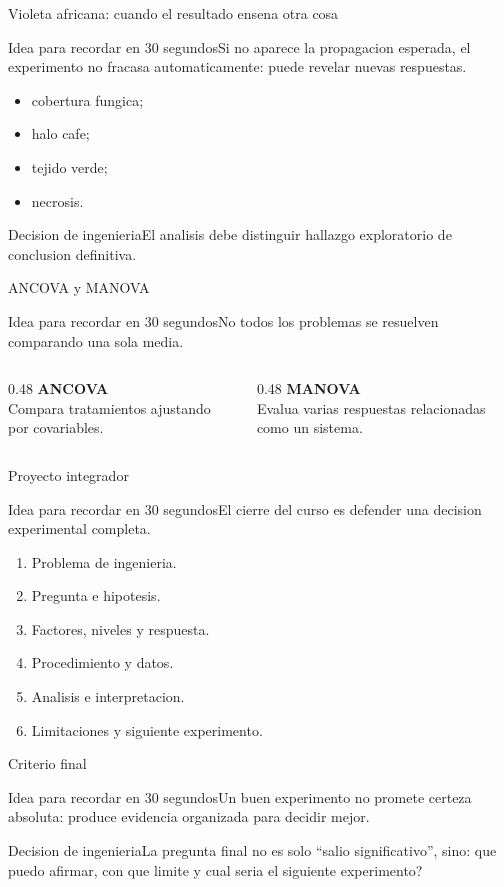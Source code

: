 \documentclass[aspectratio=169,11pt]{beamer}
\newcommand{\idea}[1]{\begin{block}{Idea para recordar en 30 segundos}#1\end{block}}
\newcommand{\decision}[1]{\begin{alertblock}{Decision de ingenieria}#1\end{alertblock}}
\begin{document}
\begin{frame}{Violeta africana: cuando el resultado ensena otra cosa}
  \idea{Si no aparece la propagacion esperada, el experimento no fracasa automaticamente: puede revelar nuevas respuestas.}
  \begin{itemize}
    \item cobertura fungica;
    \item halo cafe;
    \item tejido verde;
    \item necrosis.
  \end{itemize}
  \decision{El analisis debe distinguir hallazgo exploratorio de conclusion definitiva.}
\end{frame}

\begin{frame}{ANCOVA y MANOVA}
  \idea{No todos los problemas se resuelven comparando una sola media.}
  \begin{columns}[T]
    \begin{column}{0.48\textwidth}
      \textbf{ANCOVA}\\
      Compara tratamientos ajustando por covariables.
    \end{column}
    \begin{column}{0.48\textwidth}
      \textbf{MANOVA}\\
      Evalua varias respuestas relacionadas como un sistema.
    \end{column}
  \end{columns}
\end{frame}

\begin{frame}{Proyecto integrador}
  \idea{El cierre del curso es defender una decision experimental completa.}
  \begin{enumerate}
    \item Problema de ingenieria.
    \item Pregunta e hipotesis.
    \item Factores, niveles y respuesta.
    \item Procedimiento y datos.
    \item Analisis e interpretacion.
    \item Limitaciones y siguiente experimento.
  \end{enumerate}
\end{frame}

\begin{frame}{Criterio final}
  \idea{Un buen experimento no promete certeza absoluta: produce evidencia organizada para decidir mejor.}
  \decision{La pregunta final no es solo ``salio significativo'', sino: que puedo afirmar, con que limite y cual seria el siguiente experimento?}
\end{frame}
\end{document}
